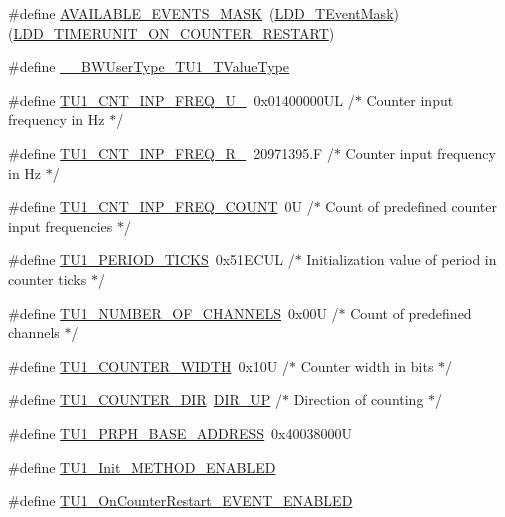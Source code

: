 \begin{DoxyCompactItemize}
\item 
\#define \hyperlink{group___t_u1__module_ga5f04a8830cd52a3ffa1678d113f31aee}{A\+V\+A\+I\+L\+A\+B\+L\+E\+\_\+\+E\+V\+E\+N\+T\+S\+\_\+\+M\+A\+SK}~(\hyperlink{group___p_e___types__module_gafbe7f4d4e51560399c3bdd0218584533}{L\+D\+D\+\_\+\+T\+Event\+Mask})(\hyperlink{group___p_e___types__module_gae8e6bf9d76916611a08b76f20ceb1ef7}{L\+D\+D\+\_\+\+T\+I\+M\+E\+R\+U\+N\+I\+T\+\_\+\+O\+N\+\_\+\+C\+O\+U\+N\+T\+E\+R\+\_\+\+R\+E\+S\+T\+A\+RT})
\item 
\#define \hyperlink{group___t_u1__module_gaf0b58bf613a080724fc73a1d8b13ff39}{\+\_\+\+\_\+\+B\+W\+User\+Type\+\_\+\+T\+U1\+\_\+\+T\+Value\+Type}
\item 
\#define \hyperlink{group___t_u1__module_ga85cc4897457440a2308166668f49da10}{T\+U1\+\_\+\+C\+N\+T\+\_\+\+I\+N\+P\+\_\+\+F\+R\+E\+Q\+\_\+\+U\+\_}~0x01400000\+U\+L /$\ast$ Counter input frequency in Hz $\ast$/
\item 
\#define \hyperlink{group___t_u1__module_ga4913c95039859613c2db9d00795ab5d6}{T\+U1\+\_\+\+C\+N\+T\+\_\+\+I\+N\+P\+\_\+\+F\+R\+E\+Q\+\_\+\+R\+\_}~20971395.\+F /$\ast$ Counter input frequency in Hz $\ast$/
\item 
\#define \hyperlink{group___t_u1__module_ga855f7e71146b18903d56643ec80c5ddb}{T\+U1\+\_\+\+C\+N\+T\+\_\+\+I\+N\+P\+\_\+\+F\+R\+E\+Q\+\_\+\+C\+O\+U\+NT}~0\+U      /$\ast$ Count of predefined counter input frequencies $\ast$/
\item 
\#define \hyperlink{group___t_u1__module_ga17e6ec4b6bb1df9067daf9ac4204db66}{T\+U1\+\_\+\+P\+E\+R\+I\+O\+D\+\_\+\+T\+I\+C\+KS}~0x51\+E\+C\+U\+L    /$\ast$ Initialization value of period in \textquotesingle{}counter ticks\textquotesingle{} $\ast$/
\item 
\#define \hyperlink{group___t_u1__module_ga15dbabf955f2e2b0f888b98320eabfa3}{T\+U1\+\_\+\+N\+U\+M\+B\+E\+R\+\_\+\+O\+F\+\_\+\+C\+H\+A\+N\+N\+E\+LS}~0x00\+U   /$\ast$ Count of predefined channels $\ast$/
\item 
\#define \hyperlink{group___t_u1__module_ga1f7080987fb558b36a77447a61d7ec4a}{T\+U1\+\_\+\+C\+O\+U\+N\+T\+E\+R\+\_\+\+W\+I\+D\+TH}~0x10\+U       /$\ast$ Counter width in bits  $\ast$/
\item 
\#define \hyperlink{group___t_u1__module_ga199a6b62d73e2782f77ac6c4f7a5ea41}{T\+U1\+\_\+\+C\+O\+U\+N\+T\+E\+R\+\_\+\+D\+IR}~\hyperlink{group___p_e___types__module_gga89181fe4df1c4701239176768b4a9ce5a0b76fb863426c07c6c997a8d9523257b}{D\+I\+R\+\_\+\+UP}      /$\ast$ Direction of counting $\ast$/
\item 
\#define \hyperlink{group___t_u1__module_ga791d7a56f94f745b0dbb9a0ff09ee0d4}{T\+U1\+\_\+\+P\+R\+P\+H\+\_\+\+B\+A\+S\+E\+\_\+\+A\+D\+D\+R\+E\+SS}~0x40038000U
\item 
\#define \hyperlink{group___t_u1__module_ga2532ba47f579738a2f954e79d2d99e9d}{T\+U1\+\_\+\+Init\+\_\+\+M\+E\+T\+H\+O\+D\+\_\+\+E\+N\+A\+B\+L\+ED}
\item 
\#define \hyperlink{group___t_u1__module_ga776fe3d89696e57b98cf36b71dbcc86c}{T\+U1\+\_\+\+On\+Counter\+Restart\+\_\+\+E\+V\+E\+N\+T\+\_\+\+E\+N\+A\+B\+L\+ED}
\end{DoxyCompactItemize}

